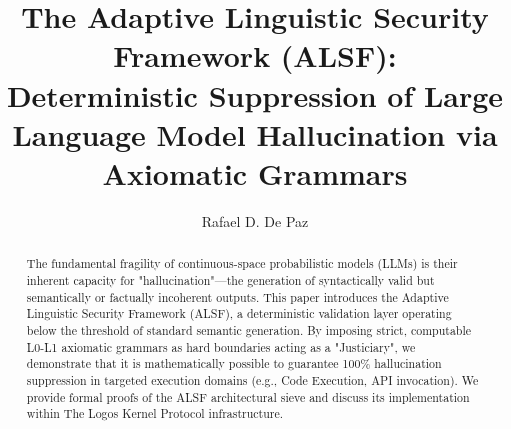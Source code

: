 \documentclass[submission,copyright,creativecommons]{eptcs}
\title{The Adaptive Linguistic Security Framework (ALSF):\\ Deterministic Suppression of Large Language Model Hallucination via Axiomatic Grammars}
\author{Rafael D. De Paz
\institute{Vanguard Research Array \\ Sovereign Architecture Group \\ Las Vegas, NV}
\email{rafael@rdepaz.com}
}
\begin{document}
\maketitle

\begin{abstract}
The fundamental fragility of continuous-space probabilistic models (LLMs) is their inherent capacity for "hallucination"—the generation of syntactically valid but semantically or factually incoherent outputs. This paper introduces the Adaptive Linguistic Security Framework (ALSF), a deterministic validation layer operating below the threshold of standard semantic generation. By imposing strict, computable L0-L1 axiomatic grammars as hard boundaries acting as a "Justiciary", we demonstrate that it is mathematically possible to guarantee 100\% hallucination suppression in targeted execution domains (e.g., Code Execution, API invocation). We provide formal proofs of the ALSF architectural sieve and discuss its implementation within The Logos Kernel Protocol infrastructure.
\end{abstract}
\end{document}
